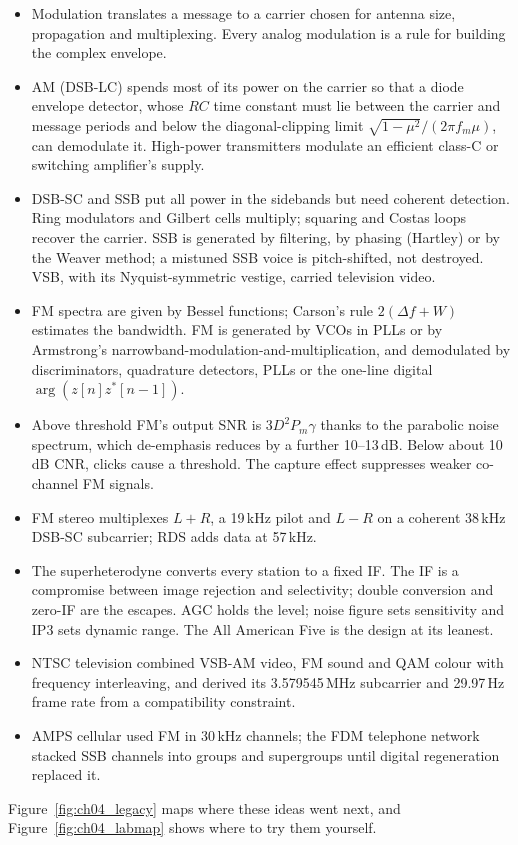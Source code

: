 \begin{itemize}
\item Modulation translates a message to a carrier chosen for antenna size, propagation and multiplexing.
Every analog modulation is a rule for building the complex envelope.
\item AM (DSB-LC) spends most of its power on the carrier so that a diode envelope detector, whose $RC$ time
constant must lie between the carrier and message periods and below the diagonal-clipping limit
$\sqrt{1-\mu^2}/(2\pi f_m\mu)$, can demodulate it. High-power transmitters modulate an efficient class-C or
switching amplifier's supply.
\item DSB-SC and SSB put all power in the sidebands but need coherent detection. Ring modulators and Gilbert
cells multiply; squaring and Costas loops recover the carrier. SSB is generated by filtering, by phasing
(Hartley) or by the Weaver method; a mistuned SSB voice is pitch-shifted, not destroyed. VSB, with its
Nyquist-symmetric vestige, carried television video.
\item FM spectra are given by Bessel functions; Carson's rule $2(\Delta f+W)$ estimates the bandwidth. FM is
generated by VCOs in PLLs or by Armstrong's narrowband-modulation-and-multiplication, and demodulated by
discriminators, quadrature detectors, PLLs or the one-line digital $\arg(z[n]z^*[n-1])$.
\item Above threshold FM's output SNR is $3D^2P_m\gamma$ thanks to the parabolic noise spectrum, which
de-emphasis reduces by a further 10--13\,dB. Below about 10\,dB CNR, clicks cause a threshold. The capture effect
suppresses weaker co-channel FM signals.
\item FM stereo multiplexes $L+R$, a 19\,kHz pilot and $L-R$ on a coherent 38\,kHz DSB-SC subcarrier; RDS adds
data at 57\,kHz.
\item The superheterodyne converts every station to a fixed IF. The IF is a compromise between image rejection
and selectivity; double conversion and zero-IF are the escapes. AGC holds the level; noise figure sets
sensitivity and IP3 sets dynamic range. The All American Five is the design at its leanest.
\item NTSC television combined VSB-AM video, FM sound and QAM colour with frequency interleaving, and derived
its 3.579545\,MHz subcarrier and 29.97\,Hz frame rate from a compatibility constraint.
\item AMPS cellular used FM in 30\,kHz channels; the FDM telephone network stacked SSB channels into groups and
supergroups until digital regeneration replaced it.
\end{itemize}
Figure~\ref{fig:ch04_legacy} maps where these ideas went next, and Figure~\ref{fig:ch04_labmap} shows
where to try them yourself.

